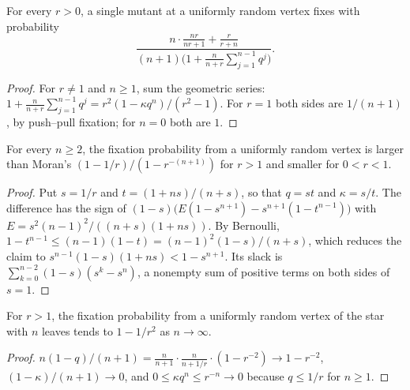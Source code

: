 \begin{theorem}\label{thm:star-sum}
\leanok{}
For every $r>0$, a single mutant at a uniformly random vertex fixes with probability
\[ \frac{n\cdot\frac{nr}{nr+1}+\frac r{r+n}}{(n+1)\big(1+\frac n{n+r}\sum_{j=1}^{n-1}q^j\big)}. \]
\end{theorem}
\begin{proof}\leanok
For $r\ne1$ and $n\ge1$, sum the geometric series: $1+\frac n{n+r}\sum_{j=1}^{n-1}q^j=
r^2(1-\kappa q^n)/(r^2-1)$. For $r=1$ both sides are $1/(n+1)$, by push--pull fixation; for
$n=0$ both are $1$.
\end{proof}
\begin{theorem}\label{thm:star-amplifier}
\leanok{}
For every $n\ge2$, the fixation probability from a uniformly random vertex is larger than
Moran's $(1-1/r)/(1-r^{-(n+1)})$ for $r>1$ and smaller for $0<r<1$.
\end{theorem}
\begin{proof}\leanok
Put $s=1/r$ and $t=(1+ns)/(n+s)$, so that $q=st$ and $\kappa=s/t$. The difference has the sign
of $(1-s)\big(E(1-s^{n+1})-s^{n+1}(1-t^{n-1})\big)$ with $E=s^2(n-1)^2/((n+s)(1+ns))$. By
Bernoulli, $1-t^{n-1}\le(n-1)(1-t)=(n-1)^2(1-s)/(n+s)$, which reduces the claim to
$s^{n-1}(1-s)(1+ns)<1-s^{n+1}$. Its slack is $\sum_{k=0}^{n-2}(1-s)(s^k-s^n)$, a nonempty sum of
positive terms on both sides of $s=1$.
\end{proof}
\begin{theorem}\label{thm:star-limit}
\leanok{}
For $r>1$, the fixation probability from a uniformly random vertex of the star with $n$ leaves
tends to $1-1/r^2$ as $n\to\infty$.
\end{theorem}
\begin{proof}\leanok
$n(1-q)/(n+1)=\frac n{n+1}\cdot\frac n{n+1/r}\cdot(1-r^{-2})\to1-r^{-2}$,
$(1-\kappa)/(n+1)\to0$, and $0\le\kappa q^n\le r^{-n}\to0$ because $q\le1/r$ for $n\ge1$.
\end{proof}
